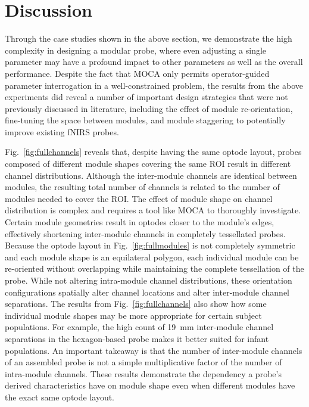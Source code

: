 \section{Discussion}
\label{sec:discussion}
Through the case studies shown in the above section, we demonstrate the high complexity in designing a modular probe, where even adjusting a single parameter may have a profound impact to other parameters as well as the overall performance. Despite the fact that MOCA only permits operator-guided parameter interrogation in a well-constrained problem, the results from the above experiments did reveal a number of important design strategies that were not previously discussed in literature, including the effect of module re-orientation, fine-tuning the space between modules, and module staggering to potentially improve existing \ac{fNIRS} probes.

Fig.~\ref{fig:fullchannels} reveals that, despite having the same optode layout, probes composed of different module shapes covering the same ROI result in different channel distributions. Although the inter-module channels are identical between modules, the resulting total number of channels is related to the number of modules needed to cover the ROI. The effect of module shape on channel distribution is complex and requires a tool like MOCA to thoroughly investigate. Certain module geometries result in optodes closer to the module's edges, effectively shortening inter-module channels in completely tessellated probes. Because the optode layout in Fig.~\ref{fig:fullmodules} is not completely symmetric and each module shape is an equilateral polygon, each individual module can be re-oriented without overlapping while maintaining the complete tessellation of the probe. While not altering intra-module channel distributions, these orientation configurations spatially alter channel locations and alter inter-module channel separations. The results from Fig.~\ref{fig:fullchannels} also show how some individual module shapes may be more appropriate for certain subject populations. For example, the high count of 19~mm inter-module channel separations in the hexagon-based probe makes it better suited for infant populations. An important takeaway is that the number of inter-module channels of an assembled probe is not a simple multiplicative factor of the number of intra-module channels. These results demonstrate the dependency a probe's derived characteristics have on module shape even when different modules have the exact same optode layout. 

